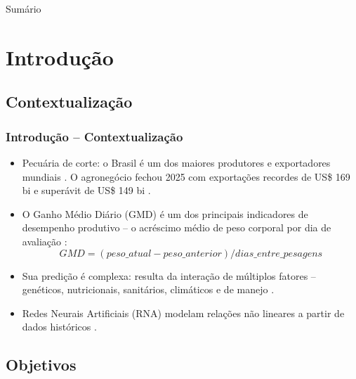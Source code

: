 \documentclass[aspectratio=1610]{beamer}
\begin{document}
\begin{frame}
  \titlepage
\end{frame}


\begin{frame}[fragile]{Sumário}
  \tableofcontents
\end{frame}


\section{Introdução}


\subsection{Contextualização}

\begin{frame}[fragile] \frametitle{Introdução -- Contextualização}
	\begin{itemize} \itemsep0.8em
	  \item Pecuária de corte: o Brasil é um dos maiores produtores e exportadores mundiais \cite{usda2026}. O agronegócio fechou 2025 com exportações recordes de US\$ 169 bi e superávit de US\$ 149 bi \cite{ministerio2026}.

	  \item O Ganho Médio Diário (GMD) é um dos principais indicadores de desempenho produtivo -- o acréscimo médio de peso corporal por dia de avaliação \cite{embrapa2026}:
	  $$GMD = (peso\_atual - peso\_anterior) / dias\_entre\_pesagens$$

    \item Sua predição é complexa: resulta da interação de múltiplos fatores -- genéticos, nutricionais, sanitários, climáticos e de manejo \cite{tambara2021, faria2025, alencastrofilho2017}.

    \item Redes Neurais Artificiais (RNA) modelam relações não lineares a partir de dados históricos \cite{silva2016, goodfellow2016}.

	\end{itemize}
\end{frame}


\subsection{Objetivos}
\end{document}
